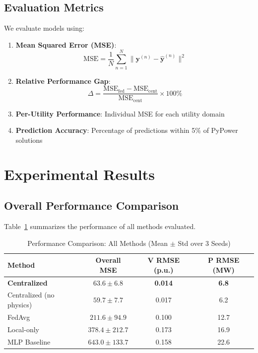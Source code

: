 \documentclass[journal,10pt]{IEEEtran}
\begin{document}
\subsection{Evaluation Metrics}

We evaluate models using:

\begin{enumerate}
    \item \textbf{Mean Squared Error (MSE)}:
    \begin{equation}
    \text{MSE} = \frac{1}{N} \sum_{n=1}^N \|\mathbf{y}^{(n)} - \hat{\mathbf{y}}^{(n)}\|^2
    \end{equation}
    
    \item \textbf{Relative Performance Gap}:
    \begin{equation}
    \Delta = \frac{\text{MSE}_{\text{fed}} - \text{MSE}_{\text{cent}}}{\text{MSE}_{\text{cent}}} \times 100\%
    \end{equation}
    
    \item \textbf{Per-Utility Performance}: Individual MSE for each utility domain
    
    \item \textbf{Prediction Accuracy}: Percentage of predictions within 5\% of PyPower solutions
\end{enumerate}

\section{Experimental Results}

\subsection{Overall Performance Comparison}

Table~\ref{tab:performance} summarizes the performance of all methods evaluated.

\begin{table}[t]
\centering
\caption{Performance Comparison: All Methods (Mean $\pm$ Std over 3 Seeds)}
\label{tab:performance}
\begin{tabular}{lccc}
\toprule
\textbf{Method} & \textbf{Overall MSE} & \textbf{V RMSE (p.u.)} & \textbf{P RMSE (MW)} \\
\midrule
\textbf{Centralized} & $\mathbf{63.6 \pm 6.8}$ & \textbf{0.014} & \textbf{6.8} \\
Centralized (no physics) & $59.7 \pm 7.7$ & 0.017 & 6.2 \\
FedAvg & $211.6 \pm 94.9$ & 0.100 & 12.7 \\
Local-only & $378.4 \pm 212.7$ & 0.173 & 16.9 \\
MLP Baseline & $643.0 \pm 133.7$ & 0.158 & 22.6 \\
\bottomrule
\end{tabular}
\end{table}
\end{document}

